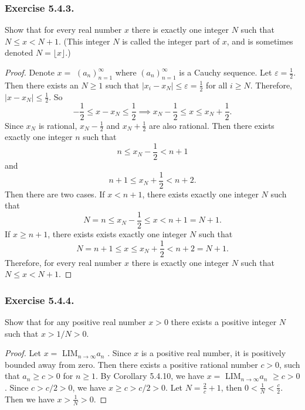 \documentclass[12pt, letter]{article}
\newcommand{\an}{$(a_n)_{n=1}^\infty$ }
\newcommand{\la}{LIM$_{n\to\infty}a_n$  }
\begin{document}
\subsubsection*{Exercise 5.4.3.}
Show that for every real number $x$ there is exactly one integer $N$ such that $N\leq x<N+1$. (This integer $N$ is called the integer part of $x$, and is sometimes denoted $N=\lfloor x\rfloor$.)
\begin{proof}
    Denote $x=$ \an where \an is a Cauchy sequence. Let $\varepsilon=\frac{1}{2}$. Then there exists an $N\geq 1$ such that $|x_i-x_N|\leq \varepsilon=\frac{1}{2}$ for all $i\geq N$. 
    Therefore, $|x-x_N|\leq \frac{1}{2}$. So 
    \begin{equation*}
        -\frac{1}{2}\leq x-x_N\leq \frac{1}{2}\implies x_N-\frac{1}{2}\leq x \leq x_N+\frac{1}{2}.
    \end{equation*}
    Since $x_N$ is rational, $x_N-\frac{1}{2}$ and $x_N+\frac{1}{2}$ are also rational. Then there exists exactly one integer $n$ such that 
    \begin{equation*}
        n\leq x_N-\frac{1}{2}<n+1
    \end{equation*}
    and 
    \begin{equation*}
        n+1\leq x_N+\frac{1}{2}<n+2.
    \end{equation*}
    Then there are two cases. If $x<n+1$, there exists exactly one integer $N$ such that 
    \begin{equation*}
        N=n\leq x_N-\frac{1}{2}\leq x<n+1=N+1.
    \end{equation*}
    If $x\geq n+1$, there exists exists exactly one integer $N$ such that 
    \begin{equation*}
        N=n+1\leq x\leq x_N+\frac{1}{2}<n+2=N+1.
    \end{equation*}
    Therefore, for every real number $x$ there is exactly one integer $N$ such that $N\leq x<N+1$.
 \end{proof}
 \subsubsection*{Exercise 5.4.4.}
Show that for any positive real number $x>0$ there exists a positive integer $N$ such that $x>1/N>0$.
\begin{proof}
    Let $x=$ \la. Since $x$ is a positive real number, it is positively bounded away from zero. Then there exists a positive rational number $c>0$, such that $a_n\geq c>0$
    for $n\geq 1$. By Corollary 5.4.10, we have $x=$ \la $\geq c>0$. Since $c>c/2>0$, we have $x\geq c>c/2>0$. Let $N=\frac{2}{c}+1$, then $0<\frac{1}{N}<\frac{c}{2}$. 
    Then we have $x>\frac{1}{N}>0$.
\end{proof}
\end{document}
